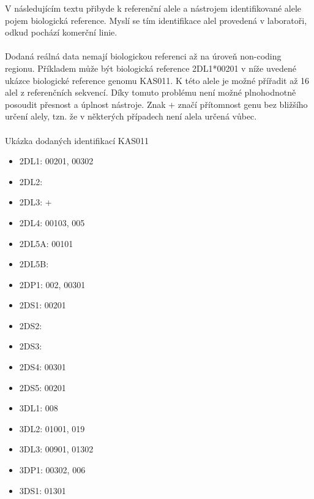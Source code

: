 \documentclass[czech,DP]{thesiskiv}
\numberwithin{equation}{section}
\begin{document}
\begin{center}
\label{tab:cut_quality}
\end{center}

\noindent
V následujícím textu přibyde k referenční alele a nástrojem identifikované alele pojem biologická reference. Myslí se tím identifikace alel provedená v laboratoři, odkud pochází komerční linie.
\\
\\
Dodaná reálná data nemají biologickou referenci až na úroveň non-coding regionu. Příkladem může být biologická reference 2DL1*00201 v níže uvedené ukázce biologické reference genomu KAS011. K této alele je možné přířadit až 16 alel z referenčních sekvencí. Díky tomuto problému není možné plnohodnotně posoudit přesnost a úplnost nástroje. Znak $+$ značí přítomnost genu bez bližšího určení alely, tzn. že v některých případech není alela určená vůbec.
\\
\\
\noindent 
Ukázka dodaných identifikací KAS011
\begin{multicols}{2}
\begin{itemize}
	\itemsep0em
	\item 2DL1: 00201, 00302
	\item 2DL2:
	\item 2DL3: +
	\item 2DL4: 00103, 005
	\item 2DL5A: 00101
	\item 2DL5B:
	\item 2DP1: 002, 00301
	\item 2DS1: 00201
	\item 2DS2:
	\item 2DS3:
	\item 2DS4: 00301
	\item 2DS5: 00201
	\item 3DL1: 008
	\item 3DL2: 01001, 019
	\item 3DL3: 00901, 01302
	\item 3DP1: 00302, 006
	\item 3DS1: 01301
\end{itemize}
\end{multicols}
\end{document}
